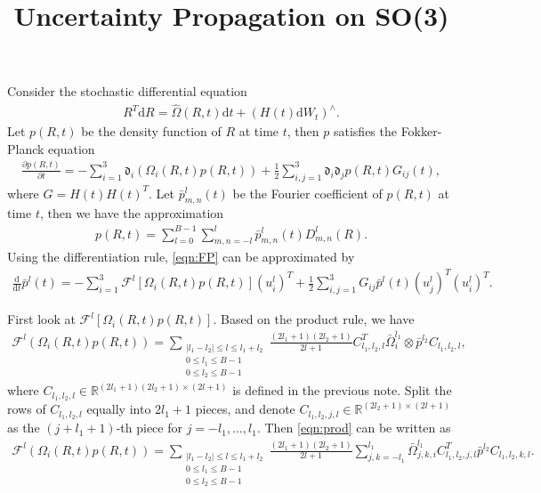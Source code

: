 \documentclass[12pt]{article}
\title{\vspace{-4ex}\textbf{Uncertainty Propagation on SO(3)\vspace{-4ex}}}
\date{}
\newcommand{\abs}[1]{\ensuremath{\left| #1 \right|}}
\newcommand{\diff}[1]{\mathrm{d}#1}
\newcommand{\liediff}{\mathfrak{d}}
\newcommand{\dft}{\mathcal{F}}
\newcommand{\real}{\ensuremath{\mathbb{R}}}
\begin{document}
\maketitle

Consider the stochastic differential equation
\begin{align*}
	R^T\diff{R} = \hat{\Omega}(R,t)\diff{t} + (H(t)\diff{W_t})^\wedge.
\end{align*}
Let $p(R,t)$ be the density function of $R$ at time $t$, then $p$ satisfies the Fokker-Planck equation
\begin{align}
	\frac{\partial p(R,t)}{\partial t} = -\sum_{i=1}^3 \liediff_i(\Omega_i(R,t)p(R,t)) + \frac{1}{2} \sum_{i,j=1}^3 \liediff_i\liediff_jp(R,t) G_{ij}(t), \label{eqn:FP}
\end{align}
where $G = H(t)H(t)^T$.
Let $\bar{p}_{m,n}^l(t)$ be the Fourier coefficient of $p(R,t)$ at time $t$, then we have the approximation
\begin{align*}
	p(R,t) = \sum_{l=0}^{B-1} \sum_{m,n=-l}^l \bar{p}_{m,n}^l(t) D_{m,n}^l(R).
\end{align*}
Using the differentiation rule, \eqref{eqn:FP} can be approximated by
\begin{align*}
	\frac{\diff{}}{\diff{t}} \bar{p}^l(t) = -\sum_{i=1}^3 \dft^l[\Omega_i(R,t)p(R,t)] (u_i^l)^T + \frac{1}{2}\sum_{i,j=1}^3 G_{ij} \bar{p}^l(t) (u_j^l)^T(u_i^l)^T.
\end{align*}

First look at $\mathcal{F}^l[\Omega_i(R,t)p(R,t)]$.
Based on the product rule, we have
\begin{align}
	\mathcal{F}^l(\Omega_i(R,t)p(R,t)) = \sum_{\substack{\abs{l_1-l_2} \leq l \leq l_1+l_2 \\ 0 \leq l_1 \leq B-1 \\ 0 \leq l_2 \leq B-1}} \frac{(2l_1+1)(2l_2+1)}{2l+1} C_{l_1,l_2,l}^T \bar{\Omega}_i^{l_1} \otimes \bar{p}^{l_2} C_{l_1,l_2,l}, \label{eqn:prod}
\end{align}
where $C_{l_1,l_2,l}\in\real^{(2l_1+1)(2l_2+1) \times (2l+1)}$ is defined in the previous note.
Split the rows of $C_{l_1,l_2,l}$ equally into $2l_1+1$ pieces, and denote $C_{l_1,l_2,j,l} \in \real^{(2l_2+1) \times (2l+1)}$ as the $(j+l_1+1)$-th piece for $j=-l_1,\ldots,l_1$.
Then \eqref{eqn:prod} can be written as
\begin{align*}
	\mathcal{F}^l(\Omega_i(R,t)p(R,t)) = \sum_{\substack{\abs{l_1-l_2} \leq l \leq l_1+l_2 \\ 0 \leq l_1 \leq B-1 \\ 0 \leq l_2 \leq B-1}} \frac{(2l_1+1)(2l_2+1)}{2l+1} \sum_{j,k=-l_1}^{l_1} \bar{\Omega}_{j,k,i}^{l_1} C_{l_1,l_2,j,l}^T \bar{p}^{l_2} C_{l_1,l_2,k,l}.
\end{align*}
\end{document}
